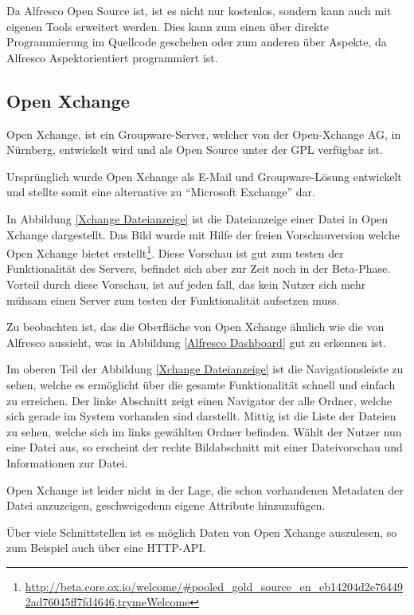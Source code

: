 Da Alfresco Open Source ist, ist es nicht nur kostenlos, sondern kann auch mit eigenen Tools erweitert werden. Dies kann zum einen \"uber direkte Programmierung im Quellcode geschehen oder zum anderen \"uber Aspekte, da Alfresco Aspektorientiert programmiert ist. \cite{Alfresco_und_Liferay}

\subsection{Open Xchange} \label{Open Xchange}
Open Xchange, ist ein Groupware-Server, welcher von der Open-Xchange AG, in N\"urnberg, entwickelt wird und als Open Source unter der \ac{GPL} verf\"ugbar ist. \cite{Xchange_Seite} \cite{Xchange_Golem}

Urspr\"unglich wurde Open Xchange als E-Mail und Groupware-L\"osung entwickelt und stellte somit eine alternative zu "`Microsoft Exchange"' dar. \cite{Wiki_Xchange}

In Abbildung \ref{Xchange Dateianzeige} ist die Dateianzeige einer Datei in Open Xchange dargestellt. Das Bild wurde mit Hilfe der freien Vorschauversion welche Open Xchange bietet erstellt\footnote{\url{http://beta.core.ox.io/welcome/\#pooled\_gold\_source\_en\_eb14204d2e764492ad76045ff7fd4646,trymeWelcome}}. Diese Vorschau ist gut zum testen der Funktionalit\"at des Servers, befindet sich aber zur Zeit noch in der Beta-Phase. Vorteil durch diese Vorschau, ist auf jeden fall, das kein Nutzer sich mehr m\"uhsam einen Server zum testen der Funktionalit\"at aufsetzen muss.

Zu beobachten ist, das die Oberfl\"ache von Open Xchange \"ahnlich wie die von Alfresco aussieht, was in Abbildung \ref{Alfresco Dashboard} gut zu erkennen ist.

Im oberen Teil der Abbildung \ref{Xchange Dateianzeige} ist die Navigationsleiste zu sehen, welche es erm\"oglicht \"uber die gesamte Funktionalit\"at schnell und einfach zu erreichen. Der linke Abschnitt zeigt einen Navigator der alle Ordner, welche sich gerade im System vorhanden sind darstellt. Mittig ist die Liste der Dateien zu sehen, welche sich im links gew\"ahlten Ordner befinden. W\"ahlt der Nutzer nun eine Datei aus, so erscheint der rechte Bildabschnitt mit einer Dateivorschau und Informationen zur Datei.

Open Xchange ist leider nicht in der Lage, die schon vorhandenen Metadaten der Datei anzuzeigen, geschweigedenn eigene Attribute hinzuzuf\"ugen.

\"Uber viele Schnittstellen ist es m\"oglich Daten von Open Xchange auszulesen, so zum Beispiel auch \"uber eine HTTP-\ac{API}. \cite{Oxpedia_HTTP_API}

